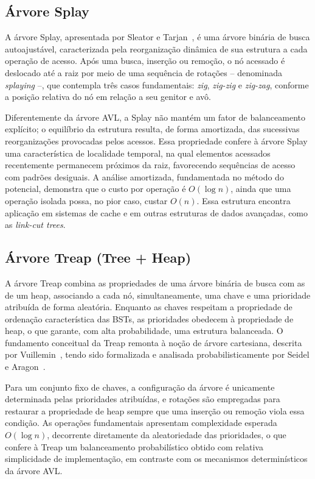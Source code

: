 \documentclass[conference]{IEEEtran}
\begin{document}
\subsection{Árvore Splay}

A árvore Splay, apresentada por Sleator e Tarjan~\cite{sleator1985}, é uma árvore binária de busca autoajustável, caracterizada pela reorganização dinâmica de sua estrutura a cada operação de acesso. Após uma busca, inserção ou remoção, o nó acessado é deslocado até a raiz por meio de uma sequência de rotações -- denominada \textit{splaying} --, que contempla três casos fundamentais: \textit{zig}, \textit{zig-zig} e \textit{zig-zag}, conforme a posição relativa do nó em relação a seu genitor e avô.

Diferentemente da árvore AVL, a Splay não mantém um fator de balanceamento explícito; o equilíbrio da estrutura resulta, de forma amortizada, das sucessivas reorganizações provocadas pelos acessos. Essa propriedade confere à árvore Splay uma característica de localidade temporal, na qual elementos acessados recentemente permanecem próximos da raiz, favorecendo sequências de acesso com padrões desiguais. A análise amortizada, fundamentada no método do potencial, demonstra que o custo por operação é $O(\log n)$, ainda que uma operação isolada possa, no pior caso, custar $O(n)$. Essa estrutura encontra aplicação em sistemas de cache e em outras estruturas de dados avançadas, como as \textit{link-cut trees}.

\subsection{Árvore Treap (Tree + Heap)}

A árvore Treap combina as propriedades de uma árvore binária de busca com as de um heap, associando a cada nó, simultaneamente, uma chave e uma prioridade atribuída de forma aleatória. Enquanto as chaves respeitam a propriedade de ordenação característica das BSTs, as prioridades obedecem à propriedade de heap, o que garante, com alta probabilidade, uma estrutura balanceada. O fundamento conceitual da Treap remonta à noção de árvore cartesiana, descrita por Vuillemin~\cite{vuillemin1980}, tendo sido formalizada e analisada probabilisticamente por Seidel e Aragon~\cite{seidel1996}.

Para um conjunto fixo de chaves, a configuração da árvore é unicamente determinada pelas prioridades atribuídas, e rotações são empregadas para restaurar a propriedade de heap sempre que uma inserção ou remoção viola essa condição. As operações fundamentais apresentam complexidade esperada $O(\log n)$, decorrente diretamente da aleatoriedade das prioridades, o que confere à Treap um balanceamento probabilístico obtido com relativa simplicidade de implementação, em contraste com os mecanismos determinísticos da árvore AVL.
\end{document}
